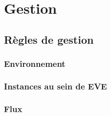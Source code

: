 \section{Gestion}
\subsection{Règles de gestion}
\subsubsection{Environnement}
\subsubsection{Instances au sein de EVE}
\subsubsection{Flux}